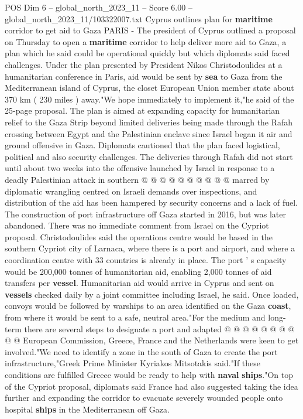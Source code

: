 \begin{textsample}{POS Dim 6 – global\_north\_2023\_11 – Score 6.00 – global\_north\_2023\_11/103322007.txt}  \label{ex:f6_pos_254}
Cyprus outlines plan for \textbf{maritime} corridor to get aid to Gaza PARIS - The president of Cyprus outlined a proposal on Thursday to open a \textbf{maritime} corridor to help deliver more aid to Gaza, a plan which he said could be operational quickly but which diplomats said faced challenges.
Under the plan presented by President Nikos Christodoulides at a humanitarian conference in Paris, aid would be sent by \textbf{sea} to Gaza from the Mediterranean island of Cyprus, the closet European Union member state about 370 km ( 230 miles ) away."We hope immediately to implement it,"he said of the 25-page proposal.
The plan is aimed at expanding capacity for humanitarian relief to the Gaza Strip beyond limited deliveries being made through the Rafah crossing between Egypt and the Palestinian enclave since Israel began it air and ground offensive in Gaza.
Diplomats cautioned that the plan faced logistical, political and also security challenges.
The deliveries through Rafah did not start until about two weeks into the offensive launched by Israel in response to a deadly Palestinian attack in southern @ @ @ @ @ @ @ @ @ @ marred by diplomatic wrangling centred on Israeli demands over inspections, and distribution of the aid has been hampered by security concerns and a lack of fuel.
The construction of port infrastructure off Gaza started in 2016, but was later abandoned.
There was no immediate comment from Israel on the Cypriot proposal.
Christodoulides said the operations centre would be based in the southern Cypriot city of Larnaca, where there is a port and airport, and where a coordination centre with 33 countries is already in place.
The port ' s capacity would be 200,000 tonnes of humanitarian aid, enabling 2,000 tonnes of aid transfers per \textbf{vessel}.
Humanitarian aid would arrive in Cyprus and sent on \textbf{vessels} checked daily by a joint committee including Israel, he said.
Once loaded, convoys would be followed by warships to an area identified on the Gaza \textbf{coast}, from where it would be sent to a safe, neutral area."For the medium and long-term there are several steps to designate a port and adapted @ @ @ @ @ @ @ @ @ @ European Commission, Greece, France and the Netherlands were keen to get involved."We need to identify a zone in the south of Gaza to create the port infrastructure,"Greek Prime Minister Kyriakos Mitsotakis said."If these conditions are fulfilled Greece would be ready to help with \textbf{naval} \textbf{ships}."On top of the Cypriot proposal, diplomats said France had also suggested taking the idea further and expanding the corridor to evacuate severely wounded people onto hospital \textbf{ships} in the Mediterranean off Gaza.

\end{textsample}
